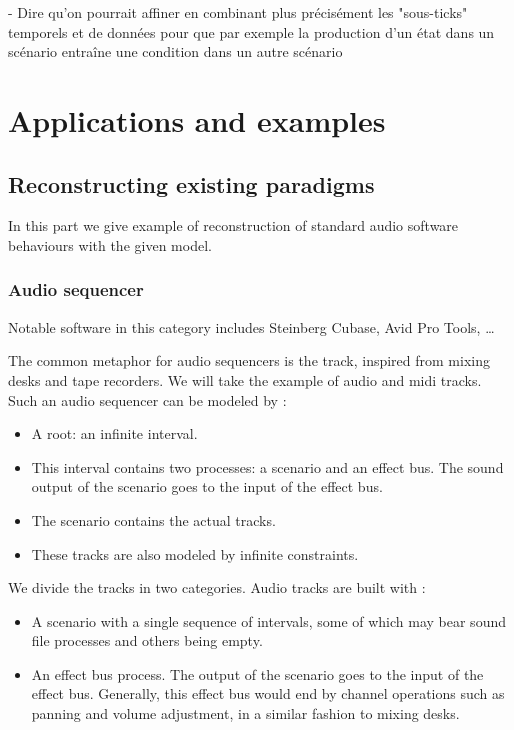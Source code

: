 \documentclass[applsci,article,submit,moreauthors,pdftex,10pt,a4paper]{mdpi}
\begin{document}
- Dire qu'on pourrait affiner en combinant plus précisément les "sous-ticks" temporels et de données
pour que par exemple la production d'un état dans un scénario entraîne une condition dans un autre scénario


\section{Applications and examples}

\subsection{Reconstructing existing paradigms}
In this part we give example of reconstruction of standard audio software behaviours with the given model.
\subsubsection{Audio sequencer}
Notable software in this category includes Steinberg Cubase, Avid Pro Tools, \dots

The common metaphor for audio sequencers is the track, inspired from mixing desks and tape recorders. 
We will take the example of audio and midi tracks. 
Such an audio sequencer can be modeled by : 

\begin{itemize}
    \item A root: an infinite interval.
    \item This interval contains two processes: a scenario and an effect bus. 
    The sound output of the scenario goes to the input of the effect bus.
    \item The scenario contains the actual tracks.
    \item These tracks are also modeled by infinite constraints.
\end{itemize}

We divide the tracks in two categories.
Audio tracks are built with : 
\begin{itemize}
  \item A scenario with a single sequence of intervals, some of which may bear sound file processes and others being empty.
  \item An effect bus process. The output of the scenario goes to the input of the effect bus. Generally, this effect bus would end by channel operations such as panning and volume adjustment, in a similar fashion to mixing desks.
\end{itemize} 
\end{document}
